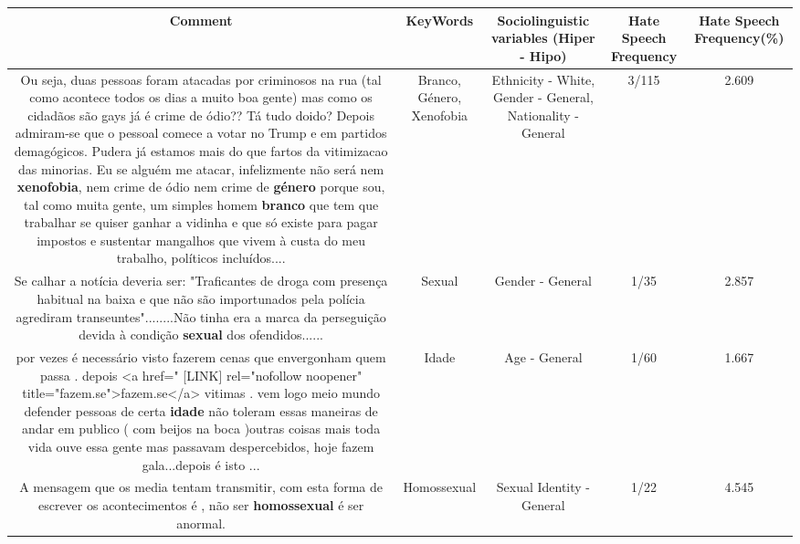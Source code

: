 \documentclass[11pt]{article}
\newlength\mylength
\begin{document}
\begin{center}
\setlength\mylength{\dimexpr\textwidth - 1\arrayrulewidth - 50\tabcolsep}
\begin{longtable}{|C{.65\mylength}|C{.30\mylength}|C{.12\mylength}|C{.12\mylength}|C{.12\mylength}|}
\hline
\textbf{Comment} & \textbf{KeyWords} & \textbf{Sociolinguistic variables (Hiper - Hipo)}  & \textbf{Hate Speech Frequency} & \textbf{Hate Speech Frequency(\%)} \\
\hline{}\small Ou seja, duas pessoas foram atacadas por criminosos na rua (tal como acontece todos os dias a muito boa gente) mas como os cidadãos são gays já é crime de ódio?? Tá tudo doido? Depois admiram-se que o pessoal comece a votar no Trump e em partidos demagógicos. Pudera já estamos mais do que fartos da vitimizacao das minorias. Eu se alguém me atacar, infelizmente não será nem \textbf{xenofobia}, nem crime de ódio nem crime de \textbf{género} porque sou, tal como muita gente, um simples homem \textbf{branco} que tem que trabalhar se quiser ganhar a vidinha e que só existe para pagar impostos e sustentar mangalhos que vivem à custa do meu trabalho, políticos incluídos....\normalsize   & Branco, Género, Xenofobia & Ethnicity - White, Gender - General, Nationality - General & 3/115 & 2.609 \\  \hline
  \small Se calhar a notícia deveria ser: "Traficantes de droga com presença habitual na baixa e que não são importunados pela polícia agrediram transeuntes"........Não tinha era a marca da perseguição devida à condição \textbf{sexual} dos ofendidos......\normalsize   & Sexual & Gender - General & 1/35 & 2.857 \\  \hline
  \small por  vezes   é  necessário   visto  fazerem  cenas  que  envergonham quem passa   . depois <a href=" [LINK]  rel="nofollow noopener" title="fazem.se">fazem.se</a>  vitimas  .  vem  logo  meio  mundo  defender pessoas  de  certa \textbf{idade}  não toleram  essas  maneiras  de  andar  em  publico  ( com  beijos  na boca  )outras coisas mais  toda vida  ouve  essa gente  mas passavam  despercebidos,  hoje fazem  gala...depois  é  isto   ...\normalsize   & Idade & Age - General & 1/60 & 1.667 \\  \hline
  \small A mensagem que os media tentam  transmitir, com esta  forma de escrever os  acontecimentos é , não ser \textbf{homossexual}  é ser anormal.\normalsize   & Homossexual & Sexual Identity - General & 1/22 & 4.545 \\  \hline

\end{longtable}
\end{center}
\end{document}
